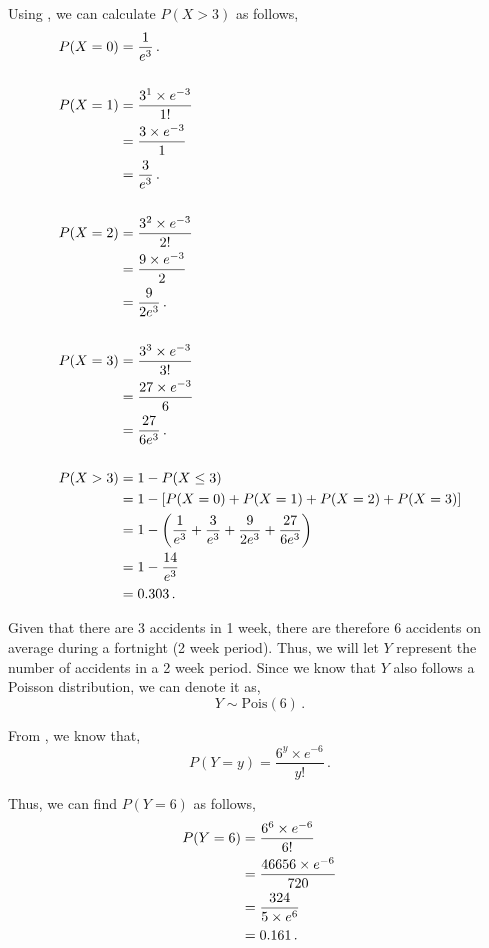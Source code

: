 \begin{subquestions}
\begin{subsubquestions}
Using , we can calculate $P(X>3)$ as follows,
\begin{align}
	P(X=0) & = \frac{1}{e^3} \,. \\ \nonumber \\
	P(X=1) & = \frac{ 3^1 \times e^{-3}}{1!} \nonumber \\
	       & = \frac{3 \times e^{-3}}{1} \nonumber \\
	       & = \frac{3}{e^3} \,. \\ \nonumber \\
	P(X=2) & = \frac{ 3^2 \times e^{-3}}{2!} \nonumber \\
	       & = \frac{9 \times e^{-3}}{2} \nonumber \\
	       & = \frac{9}{2e^3} \,. \\ \nonumber \\
	P(X=3) & = \frac{ 3^3 \times e^{-3}}{3!} \nonumber \\
	       & = \frac{27 \times e^{-3}}{6} \nonumber \\
	       & = \frac{27}{6e^3} \,. \\ \nonumber \\
	P(X>3) & =1-P(X \leq 3) \nonumber \\
		   & = 1 - [P(X=0)+P(X=1)+P(X=2)+P(X=3)] \nonumber \\
		   & = 1 - \left(\frac{1}{e^3} + \frac{3}{e^3} + \frac{9}{2e^3} + \frac{27}{6e^3} \right) \nonumber \\
		   & = 1 - \frac{14}{e^3} \nonumber \\
		   & = 0.303 \,.
\end{align}


Given that there are 3 accidents in 1 week, there are therefore 6 accidents on average during a fortnight (2 week period). Thus, we will let $Y$ represent the number of accidents in a 2 week period. Since we know that $Y$ also follows a Poisson distribution, we can denote it as,
\begin{equation}
	Y \sim \text{Pois}(6) \,.
\end{equation} 

From , we know that,
\begin{equation}
	P(Y = y) =\frac{ 6 ^ y \times e^{-6}}{y!} \,.
\end{equation}

Thus, we can find $P(Y=6)$ as follows,
\begin{align}
	P(Y = 6) & = \frac{ 6 ^ 6 \times e^{-6}}{6!} \nonumber \\	
	         & = \frac{46656 \times e^{-6}}{720} \nonumber \\
	         & = \frac{324}{5 \times e^6} \nonumber \\
	         & = 0.161 \,.
\end{align}


\end{subsubquestions}
\end{subquestions}
